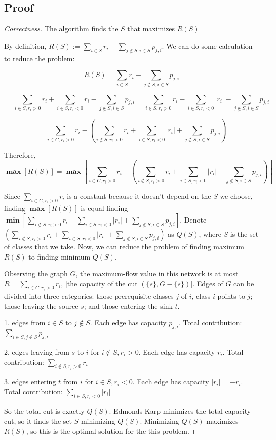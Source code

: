 \documentclass[openany]{article}
\begin{document}
\subsection*{Proof}
\begin{proof}[Correctness]{The algorithm finds the $S$ that maximizes $R(S)$}

By definition, $R(S):=\sum_{i\in S}r_i-\sum_{j\notin S, i\in S}p_{j,i}$. We can do some calculation to reduce the problem:

\[R(S) = \sum_{i\in S}r_i-\sum_{j\notin S, i\in S}p_{j,i}\]

\[= \sum_{i\in S, r_i>0}r_i + \sum_{i\in S, r_i<0}r_i - \sum_{j\notin S, i\in S}p_{j,i} = \sum_{i\in S, r_i>0}r_i - \sum_{i\in S, r_i<0}|r_i| - \sum_{j\notin S, i\in S}p_{j,i} \]

\[=\sum_{i\in C, r_i > 0}r_i - (\sum_{i\notin S, r_i>0}r_i + \sum_{i\in S, r_i<0}|r_i| + \sum_{j\notin S, i\in S}p_{j,i}) \]

Therefore, 
\[\mathbf{\max}[R(S)] =\mathbf{\max}[\sum_{i\in C, r_i > 0}r_i - (\sum_{i\notin S, r_i>0}r_i + \sum_{i\in S, r_i<0}|r_i| + \sum_{j\notin S, i\in S}p_{j,i})] \]

Since $\sum_{i\in C, r_i>0}r_i$ is a constant because it doesn't depend on the $S$ we choose, finding $\mathbf{\max}[R(S)]$ is equal finding $\mathbf{\min}[\sum_{i\notin S, r_i>0}r_i + \sum_{i\in S, r_i<0}|r_i| + \sum_{j\notin S, i\in S}p_{j,i}]$. Denote $(\sum_{i\notin S, r_i>0}r_i + \sum_{i\in S, r_i<0}|r_i| + \sum_{j\notin S, i\in S}p_{j,i})$ as $Q(S)$, where $S$ is the set of classes that we take. Now, we can reduce the problem of finding maximum $R(S)$ to finding minimum $Q(S)$.

Observing the graph $G$,  the maximum-flow value in this network is at most $R=\sum_{i\in C,r_i>0}r_i$, [the capacity of the cut $(\{s\}, G-\{s\})$]. Edges of $G$ can be divided into three categories: those prerequisite classes $j$ of $i$, class $i$ points to $j$; those leaving the source $s$; and those entering the sink $t$. 

1. edges from $i\in S$ to $j\notin S$. Each edge has capacity $p_{j,i}$. Total contribution: $\sum_{i\in S, j\notin S}p_{j,i}$

2. edges leaving from $s$ to $i$ for $i\notin S , r_i > 0$. Each edge has capacity $r_i$. Total contribution: $\sum_{i\notin S, r_i > 0}r_i$

3. edges entering $t$ from $i$ for $i\in S, r_i < 0$. Each edge has capacity $|r_i| = -r_i$. Total contribution: $\sum_{i\in S, r_i<0}|r_i|$

So the total cut is exactly $Q(S)$. Edmonds-Karp minimizes the total capacity cut, so it finds the set $S$ minimizing $Q(S)$. Minimizing $Q(S)$ maximizes $R(S)$, so this is the optimal solution for the this problem.

\end{proof}
\end{document}
